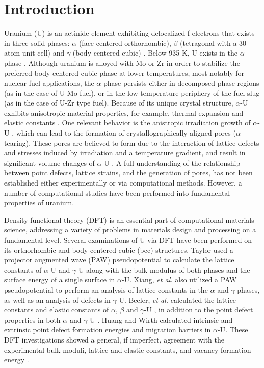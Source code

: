 \documentclass[review]{elsarticle}
\begin{document}
\section{Introduction}

Uranium (U) is an actinide element exhibiting delocalized f-electrons that exists in three solid phases: $\alpha$ (face-centered orthorhombic), $\beta$ (tetragonal with a 30 atom unit cell) and $\gamma$ (body-centered cubic) \cite{yoo1998}. Below 935 K, U exists in the $\alpha$ phase \cite{soderlind1998}. Although uranium is alloyed with Mo or Zr in order to stabilize the preferred body-centered cubic phase at lower temperatures, most notably for nuclear fuel applications, the $\alpha$ phase persists either in decomposed phase regions (as in the case of U-Mo fuel), or in the low temperature periphery of the fuel slug (as in the case of U-Zr type fuel). Because of its unique crystal structure, $\alpha$-U exhibits anisotropic material properties, for example, thermal expansion \cite{lloyd1966} and elastic constants \cite{fisher1958}. One relevant behavior is the anistropic irradiation growth of $\alpha$-U \cite{leggett1963}, which can lead to the formation of crystallographically aligned pores ($\alpha$-tearing). These pores are believed to form due to the interaction of lattice defects and stresses induced by irradiation and a temperature gradient, and result in significant volume changes of $\alpha$-U \cite{leggett1963,paine1958}. A full understanding of the relationship between point defects, lattice strains, and the generation of pores, has not been established either experimentally or via computational methods. However, a number of computational studies have been performed into fundamental properties of uranium. 

Density functional theory (DFT) is an essential part of computational materials science, addressing a variety of problems in materials design and processing on a fundamental level. Several examinations of U via DFT have been performed on its orthorhombic and body-centered cubic (bcc) structures. Taylor \cite{taylor2008} used a projector augmented wave (PAW) pseudopotential to calculate the lattice constants of $\alpha$-U and $\gamma$-U along with the bulk modulus of both phases and the surface energy of a single surface in $\alpha$-U. Xiang, \textit{et al.} \cite{xiang2008} also utilized a PAW pseudopotential to perform an analysis of lattice constants in the $\alpha$ and $\gamma$ phases, as well as an analysis of defects in $\gamma$-U. Beeler, \textit{et al.} calculated the lattice constants and elastic constants of $\alpha$, $\beta$ and $\gamma$-U \cite{beeler2013}, in addition to the point defect properties in both $\alpha$ and $\gamma$-U \cite{beeler2010}. Huang and Wirth \cite{wirth2011, wirth2012} calculated intrinsic and extrinsic point defect formation energies and migration barriers in $\alpha$-U. These DFT investigations showed a general, if imperfect, agreement with the experimental bulk moduli, lattice and elastic constants, and vacancy formation energy \cite{yoo1998, barrett1963, matter1980}. 
\end{document}
